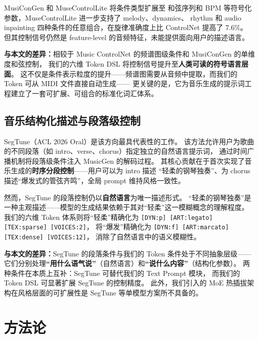 \documentclass[UTF8,12pt,a4paper]{ctexart}
\begin{document}
MusiConGen\cite{musecong} 和 MuseControlLite\cite{muselite} 将条件类型扩展至
和弦序列和 BPM 等符号化参数，MuseControlLite 进一步支持了 melody、dynamics、
rhythm 和 audio inpainting 四种条件的任意组合，在旋律准确度上比 ControlNet 提高了 7.6\%。
但其控制信号仍然是 feature-level 的音频特征，未能提供面向用户的描述语言。

\textbf{与本文的差异：}相较于 Music ControlNet 的频谱图级条件和 MusiConGen 的单维度和弦控制，
我们的六维 Token DSL 将控制信号提升至\textbf{人类可读的符号语言层面}。
这不仅是条件表示粒度的提升——频谱图需要从音频中提取，而我们的 Token 可从 MIDI 文件直接自动生成——
更关键的是，它为音乐生成的提示词工程建立了一套可扩展、可组合的标准化词汇体系。

\subsection{音乐结构化描述与段落级控制}

SegTune\cite{segtune}（ACL 2026 Oral）是该方向最具代表性的工作。
该方法允许用户为歌曲的不同段落（如 intro、verse、chorus）指定独立的自然语言提示词，
通过时间广播机制将段落级条件注入 MusicGen 的解码过程。
其核心贡献在于首次实现了音乐生成的\textbf{时序分段控制}——用户可以为 intro 描述
“轻柔的钢琴独奏”、为 chorus 描述“爆发式的管弦齐鸣”，全局 prompt 维持风格一致性。

然而，SegTune 的段落控制仍以\textbf{自然语言}为唯一描述形式。
“轻柔的钢琴独奏”是一种主观描述——模型的生成结果依赖于其对“轻柔”这一模糊概念的理解程度。
我们的六维 Token 体系则将“轻柔”精确化为 \texttt{[DYN:p] [ART:legato] [TEX:sparse] [VOICES:2]}，
将“爆发”精确化为 \texttt{[DYN:f] [ART:marcato] [TEX:dense] [VOICES:12]}，
消除了自然语言中的语义模糊性。

\textbf{与本文的差异：}SegTune 的段落条件与我们的 Token 条件处于不同抽象层级——
它们分别处理\textbf{“用什么语气说”}（自然语言）和\textbf{“说什么内容”}（结构化参数）。
两种条件在本质上互补：SegTune 可替代我们的 Text Prompt 模块，
而我们的 Token DSL 可显著扩展 SegTune 的控制精度。
此外，我们引入的 MoE 热插拔架构在风格层面的可扩展性是 SegTune 等单模型方案所不具备的。


\section{方法论}
\end{document}
